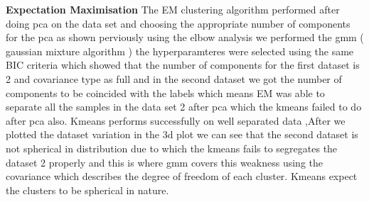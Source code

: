 \documentclass[a4paper,12pt]{article}
\begin{document}
\textbf{ Expectation Maximisation} The EM clustering algorithm performed after doing pca on the data set and choosing the appropriate number of components for the pca as shown perviously using the elbow analysis we performed the gmm ( gaussian mixture algorithm ) the hyperparamteres were selected using the same BIC criteria which showed that the number of components for the first dataset is 2 and covariance type as full and in the second dataset we got the number of components to be coincided with the labels which means EM was able to separate all the samples in the data set 2 after pca which the kmeans failed to do after pca also. Kmeans performs successfully on well separated data ,After we plotted the dataset variation in the 3d plot  we can see that the second dataset is not spherical in distribution due to which the kmeans fails to segregates the dataset 2 properly and this is where gmm covers this weakness using the covariance which describes the degree of freedom of each cluster. Kmeans expect the clusters to be spherical in nature.
\end{document}
